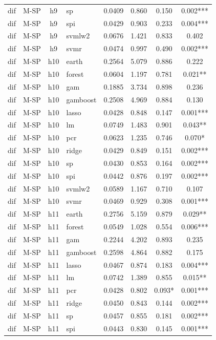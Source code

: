 \begin{ThreePartTable}
\begin{longtable}[t]{llclcccc}
dif & M-SP & h9 & sp & 0.0409 & 0.860 & 0.150 & 0.002***\\
dif & M-SP & h9 & spi & 0.0429 & 0.903 & 0.233 & 0.004***\\
dif & M-SP & h9 & svmlw2 & 0.0676 & 1.421 & 0.833 & 0.402\\
dif & M-SP & h9 & svmr & 0.0474 & 0.997 & 0.490 & 0.002***\\
\addlinespace
dif & M-SP & h10 & earth & 0.2564 & 5.079 & 0.886 & 0.222\\
dif & M-SP & h10 & forest & 0.0604 & 1.197 & 0.781 & 0.021**\\
dif & M-SP & h10 & gam & 0.1885 & 3.734 & 0.898 & 0.236\\
dif & M-SP & h10 & gamboost & 0.2508 & 4.969 & 0.884 & 0.130\\
dif & M-SP & h10 & lasso & 0.0428 & 0.848 & 0.147 & 0.001***\\
dif & M-SP & h10 & lm & 0.0749 & 1.483 & 0.901 & 0.043**\\
dif & M-SP & h10 & pcr & 0.0623 & 1.235 & 0.746 & 0.070*\\
dif & M-SP & h10 & ridge & 0.0429 & 0.849 & 0.151 & 0.002***\\
dif & M-SP & h10 & sp & 0.0430 & 0.853 & 0.164 & 0.002***\\
dif & M-SP & h10 & spi & 0.0442 & 0.876 & 0.197 & 0.002***\\
dif & M-SP & h10 & svmlw2 & 0.0589 & 1.167 & 0.710 & 0.107\\
dif & M-SP & h10 & svmr & 0.0469 & 0.929 & 0.308 & 0.001***\\
\addlinespace
dif & M-SP & h11 & earth & 0.2756 & 5.159 & 0.879 & 0.029**\\
dif & M-SP & h11 & forest & 0.0549 & 1.028 & 0.554 & 0.006***\\
dif & M-SP & h11 & gam & 0.2244 & 4.202 & 0.893 & 0.235\\
dif & M-SP & h11 & gamboost & 0.2598 & 4.864 & 0.882 & 0.175\\
dif & M-SP & h11 & lasso & 0.0467 & 0.874 & 0.183 & 0.004***\\
dif & M-SP & h11 & lm & 0.0742 & 1.389 & 0.855 & 0.015**\\
dif & M-SP & h11 & pcr & 0.0428 & 0.802 & 0.093* & 0.001***\\
dif & M-SP & h11 & ridge & 0.0450 & 0.843 & 0.144 & 0.002***\\
dif & M-SP & h11 & sp & 0.0457 & 0.855 & 0.181 & 0.002***\\
dif & M-SP & h11 & spi & 0.0443 & 0.830 & 0.145 & 0.001***\\

\end{longtable}
\end{ThreePartTable}
